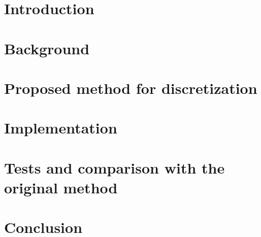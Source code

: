 \documentclass[runningheads,a4paper,11pt]{report}
\begin{document}

\begin{abstract}

\end{abstract}

\tableofcontents

\chapter{Introduction}
\label{sec:intro}


\chapter{Background}
\label{sec:background}


\chapter{Proposed method for discretization}
\label{sec:maths}


\chapter{Implementation}


\chapter{Tests and comparison with the original method}


\chapter{Conclusion}
\label{sec:conclusion}

\end{document}
